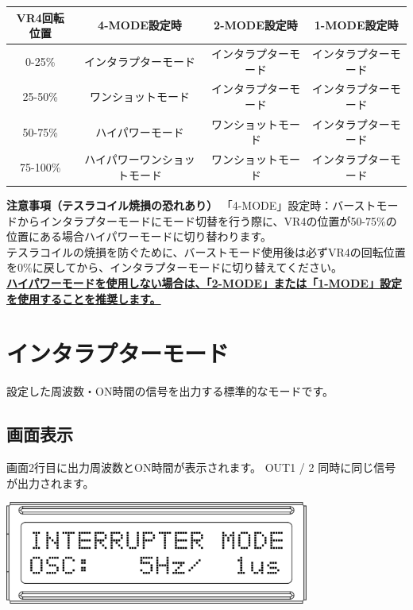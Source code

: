 \documentclass[a4paper,11pt]{jsarticle}
\begin{document}
\begin{table}[htbp]
\begin{center}
\begin{tabular}{ | c | c | c | c | }
\hline
\textbf{VR4回転位置} & \textbf{4-MODE設定時} & \textbf{2-MODE設定時} & \textbf{1-MODE設定時}  \\\hline
0-25\% & インタラプターモード & インタラプターモード & インタラプターモード \\\hline
25-50\% & ワンショットモード & インタラプターモード & インタラプターモード \\\hline
50-75\% & ハイパワーモード & ワンショットモード & インタラプターモード \\\hline
75-100\% & ハイパワーワンショットモード & ワンショットモード & インタラプターモード \\\hline
\end{tabular}
\end{center}
\end{table}


\begin{itembox}[l]{\textbf{注意事項（テスラコイル焼損の恐れあり）}}
「4-MODE」設定時：バーストモードからインタラプターモードにモード切替を行う際に、VR4の位置が50-75\%の位置にある場合ハイパワーモードに切り替わります。 \\
テスラコイルの焼損を防ぐために、バーストモード使用後は必ずVR4の回転位置を0\%に戻してから、インタラプターモードに切り替えてください。 \\
\textbf{\underline{ハイパワーモードを使用しない場合は、「2-MODE」または「1-MODE」設定を使用することを推奨します。}}
\end{itembox}



\clearpage

\section{インタラプターモード}

設定した周波数・ON時間の信号を出力する標準的なモードです。

\subsection{画面表示}

画面2行目に出力周波数とON時間が表示されます。 OUT1 / 2 同時に同じ信号が出力されます。

\vspace*{5mm}
\begin{center}
\includegraphics[width=100mm]{image/Arduino_Interrupter_v1_LCD_INT.png}
\end{center}
\vspace*{5mm}
\end{document}
